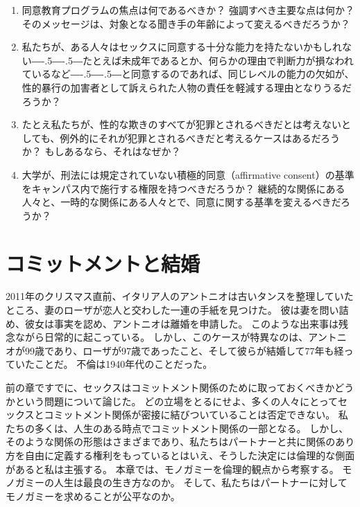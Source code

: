 \documentclass[paper=a4,book,openany]{jlreq}
\def\DDASH{―\kern-.5\zw―\kern-.5\zw―}
\begin{document}
\begin{enumerate}

\item 同意教育プログラムの焦点は何であるべきか？ 強調すべき主要な点は何か？ そのメッセージは、対象となる聞き手の年齢によって変えるべきだろうか？

\item  私たちが、ある人々はセックスに同意する十分な能力を持たないかもしれない{\DDASH}たとえば未成年であるとか、何らかの理由で判断力が損なわれているなど{\DDASH}と同意するのであれば、同じレベルの能力の欠如が、性的暴行の加害者として訴えられた人物の責任を軽減する理由となりうるだろうか？

\item  たとえ私たちが、性的な欺きのすべてが犯罪とされるべきだとは考えないとしても、例外的にそれが犯罪とされるべきだと考えるケースはあるだろうか？ もしあるなら、それはなぜか？

\item  大学が、刑法には規定されていない積極的同意（affirmative consent）の基準をキャンパス内で施行する権限を持つべきだろうか？ 継続的な関係にある人々と、一時的な関係にある人々とで、同意に関する基準を変えるべきだろうか？
\end{enumerate}

\chapter{コミットメントと結婚}

2011年のクリスマス直前、イタリア人のアントニオは古いタンスを整理していたところ、妻のローザが恋人と交わした一連の手紙を見つけた。
彼は妻を問い詰め、彼女は事実を認め、アントニオは離婚を申請した。
このような出来事は残念ながら日常的に起こっている。
しかし、このケースが特異なのは、アントニオが99歳であり、ローザが97歳であったこと、そして彼らが結婚して77年も経っていたことだ。
不倫は1940年代のことだった\citep{squires11:_divor_wife_he_discov_affair}。

前の章ですでに、セックスはコミットメント関係のために取っておくべきかどうかという問題について論じた。
どの立場をとるにせよ、多くの人々にとってセックスとコミットメント関係が密接に結びついていることは否定できない。
私たちの多くは、人生のある時点でコミットメント関係の一部となる。
しかし、そのような関係の形態はさまざまであり、私たちはパートナーと共に関係のあり方を自由に定義する権利をもっているとはいえ、そうした決定には倫理的な側面があると私は主張する。
本章では、モノガミーを倫理的観点から考察する。
モノガミーの人生は最良の生き方なのか。
そして、私たちはパートナーに対してモノガミーを求めることが公平なのか。
\end{document}
